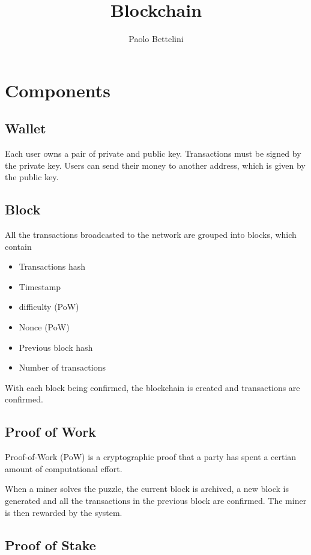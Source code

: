 \documentclass[a4paper]{article}
\title{Blockchain}
\author{Paolo Bettelini}
\date{}
\begin{document}
\maketitle
\tableofcontents
\pagebreak

\section{Components}

\subsection{Wallet}

Each user owns a pair of private and public key.
Transactions must be signed by the private key. Users
can send their money to another address, which is given by the public key.

\subsection{Block}

All the transactions broadcasted to the network are grouped into blocks, which contain

\begin{itemize}
    \item Transactions hash
    \item Timestamp
    \item difficulty (PoW)
    \item Nonce (PoW)
    \item Previous block hash
    \item Number of transactions
\end{itemize}

With each block being confirmed, the blockchain is created
and transactions are confirmed.

\subsection{Proof of Work}

Proof-of-Work (PoW) is a cryptographic proof that a party has spent
a certian amount of computational effort.

When a miner solves the puzzle, the current block is archived, a new
block is generated and all the transactions in the previous block are confirmed.
The miner is then rewarded by the system.

\subsection{Proof of Stake}
\end{document}
